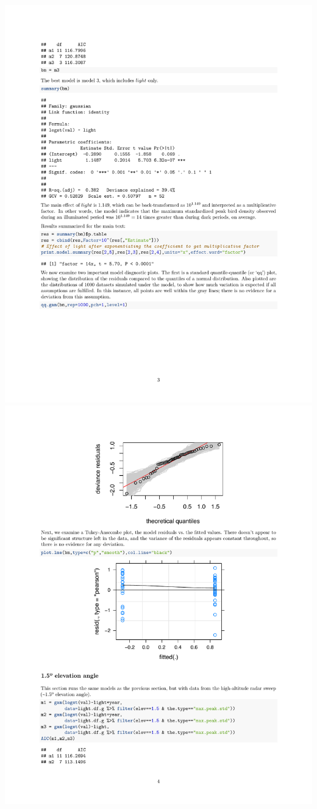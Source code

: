 \documentclass[a4paper, twoside]{templates/ociamthesis}
\begin{document}
\includegraphics[width=1\linewidth]{pdf_chapters/lights/lights_supp_crop_Part37}
\includegraphics[width=1\linewidth]{pdf_chapters/lights/lights_supp_crop_Part38}
\end{document}
